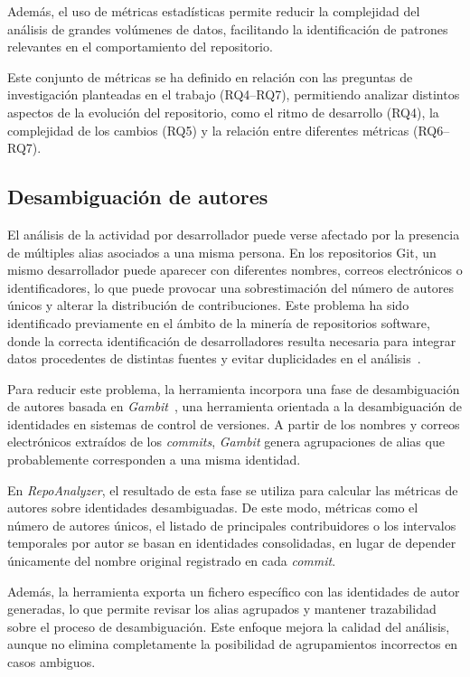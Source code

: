 \documentclass[a4paper, 12pt]{book}
\begin{document}
Además, el uso de métricas estadísticas permite reducir la complejidad del análisis de grandes volúmenes de datos, facilitando la identificación de patrones relevantes en el comportamiento del repositorio.

Este conjunto de métricas se ha definido en relación con las preguntas de investigación planteadas en el trabajo (RQ4–RQ7), permitiendo analizar distintos aspectos de la evolución del repositorio, como el ritmo de desarrollo (RQ4), la complejidad de los cambios (RQ5) y la relación entre diferentes métricas (RQ6–RQ7).

\subsection{Desambiguación de autores}
\label{subsec:desambiguacion_autores}

El análisis de la actividad por desarrollador puede verse afectado por la presencia de múltiples alias asociados a una misma persona. En los repositorios Git, un mismo desarrollador puede aparecer con diferentes nombres, correos electrónicos o identificadores, lo que puede provocar una sobrestimación del número de autores únicos y alterar la distribución de contribuciones. Este problema ha sido identificado previamente en el ámbito de la minería de repositorios software, donde la correcta identificación de desarrolladores resulta necesaria para integrar datos procedentes de distintas fuentes y evitar duplicidades en el análisis~\cite{robles2005developer}.

Para reducir este problema, la herramienta incorpora una fase de desambiguación de autores basada en \emph{Gambit}~\cite{gote2021gambit}, una herramienta orientada a la desambiguación de identidades en sistemas de control de versiones. A partir de los nombres y correos electrónicos extraídos de los \emph{commits}, \emph{Gambit} genera agrupaciones de alias que probablemente corresponden a una misma identidad.

En \emph{RepoAnalyzer}, el resultado de esta fase se utiliza para calcular las métricas de autores sobre identidades desambiguadas. De este modo, métricas como el número de autores únicos, el listado de principales contribuidores o los intervalos temporales por autor se basan en identidades consolidadas, en lugar de depender únicamente del nombre original registrado en cada \emph{commit}.

Además, la herramienta exporta un fichero específico con las identidades de autor generadas, lo que permite revisar los alias agrupados y mantener trazabilidad sobre el proceso de desambiguación. Este enfoque mejora la calidad del análisis, aunque no elimina completamente la posibilidad de agrupamientos incorrectos en casos ambiguos.
\end{document}
